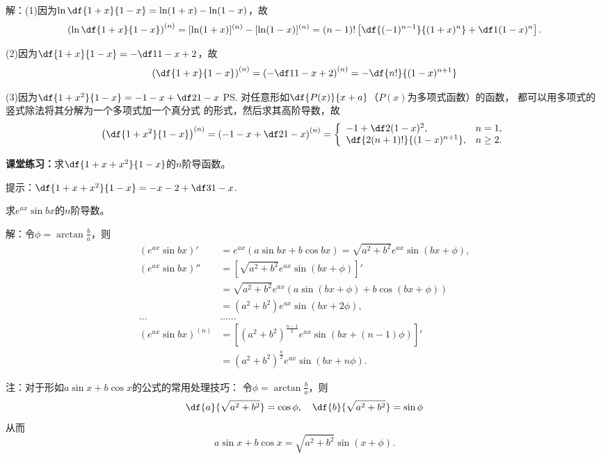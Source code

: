 解：(1)\;因为$\ln\df{1+x}{1-x}=\ln(1+x)-\ln(1-x)$，故
\begin{align*}
	\left(\ln\df{1+x}{1-x}\right)^{(n)}
	=[\ln(1+x)]^{(n)}-[\ln(1-x)]^{(n)}
	=(n-1)!\left[\df{(-1)^{n-1}}{(1+x)^n}+\df1{(1-x)^n}\right].
\end{align*}

(2)\;因为$\df{1+x}{1-x}=-\df1{1-x}+2$，故
\begin{align*}
	\left(\df{1+x}{1-x}\right)^{(n)}
	=\left(-\df1{1-x}+2\right)^{(n)}=-\df{n!}{(1-x)^{n+1}}
\end{align*}

(3)\;因为$\df{1+x^2}{1-x}=-1-x+\df2{1-x}$
\ps{对任意形如$\df{P(x)}{x+a}$（$P(x)$为多项式函数）的函数，
都可以用多项式的竖式除法将其分解为一个多项式加一个真分式
的形式，然后求其高阶导数}，故
\begin{align*}
	\left(\df{1+x^2}{1-x}\right)^{(n)}
	=\left(-1-x+\df2{1-x}\right)^{(n)}
	=\left\{ \begin{array}{ll}
		-1+\df2{(1-x)^2},& n=1,\\
		\df{2(n+1)!}{(1-x)^{n+1}},& n\geq 2.
	\end{array} \right.
\end{align*}
\fin

\bs
{\bf 课堂练习：}求$\df{1+x+x^2}{1-x}$的$n$阶导函数。

\ifhint
提示：$\df{1+x+x^2}{1-x}=-x-2+\df3{1-x}$.
\fi

\bs
\egz 求$e^{ax}\sin bx$的$n$阶导数。

解：令$\phi=\arctan\frac ba$，则
\begin{align*}
	(e^{ax}\sin bx)'
	&=e^{ax}(a\sin bx+b\cos bx)
	=\sqrt{a^2+b^2}e^{ax}\sin\left(bx+\phi\right),\\
	(e^{ax}\sin bx)''
	&=\left[\sqrt{a^2+b^2}e^{ax}\sin(bx+\phi)\right]'\\
	&=\sqrt{a^2+b^2}e^{ax}(a\sin(bx+\phi)+b\cos(bx+\phi))\\
	&=(a^2+b^2)e^{ax}\sin(bx+2\phi),\\
	\ldots&\ldots\ldots\\
	(e^{ax}\sin bx)^{(n)}
	&=\left[(a^2+b^2)^{\frac{n-1}2}e^{ax}\sin(bx+(n-1)\phi)\right]'\\
	&=(a^2+b^2)^{\frac n2}e^{ax}\sin(bx+n\phi).
\end{align*}
\fin

注：对于形如$a\sin x+b\cos x$的公式的常用处理技巧：
令$\phi=\arctan\frac ba$，则
$$\df{a}{\sqrt{a^2+b^2}}=\cos\phi,
\quad\df{b}{\sqrt{a^2+b^2}}=\sin\phi$$
从而
$$a\sin x+b\cos x=\sqrt{a^2+b^2}\sin(x+\phi).$$

